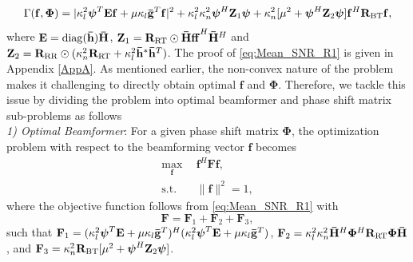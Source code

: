 \documentclass[journal,draftclsnofoot,onecolumn,12pt]{IEEEtran}
\begin{document}
\begin{align}
   \Gamma(\mathbf{f},\mathbf{\Phi}) = |\kappa_l^2\boldsymbol{\psi}^T\mathbf{Ef} + \mu\kappa_l\mathbf{\Bar{g}}^T\mathbf{f}|^2 + \kappa_l^2\kappa_n^2\boldsymbol{\psi}^H\mathbf{Z}_1\boldsymbol{\psi} + \kappa_n^2[\mu^2+\boldsymbol{\psi}^H\mathbf{Z}_2\boldsymbol{\psi}]\mathbf{f}^H\mathbf{R}_{\rm BT}\mathbf{f},\label{eq:Mean_SNR_R1}
\end{align}
where $\mathbf{E}={\rm diag}(\mathbf{\Bar{h}})\mathbf{\Bar{H}}$, $\mathbf{Z}_1 = \mathbf{R}_{\rm RT}\odot\mathbf{\Bar{H}ff}^H\mathbf{\Bar{H}}^H$ and $\mathbf{Z}_2 = \mathbf{R}_{\rm RR}\odot( \kappa_n^2\mathbf{R}_{\rm RT}+\kappa_l^2\mathbf{\Bar{h}}^*\mathbf{\Bar{h}}^T)$. The proof of \eqref{eq:Mean_SNR_R1} is given in Appendix \ref{AppA}. As mentioned earlier, the non-convex nature of the problem makes it challenging to directly obtain optimal $\mathbf{f}$ and $\mathbf{\Phi}$. Therefore, we tackle this issue by dividing the problem into optimal beamformer and phase shift matrix sub-problems as follows\\
\emph{1) Optimal Beamformer}: For a given phase shift matrix $\mathbf{\Phi}$, the optimization problem with respect to the beamforming vector $\mathbf{f}$ becomes
\begin{subequations}
\begin{align}
    \max_{\mathbf{f}} ~~& \mathbf{f}^H\mathbf{F}\mathbf{f}, \label{subprob_f_R1}\\
\text{s.t.} ~~& \|\mathbf{f}\|^2 = 1,
\end{align}
\end{subequations}
where the objective function follows from \eqref{eq:Mean_SNR_R1} with
\begin{equation}
    \mathbf{F} = \mathbf{F}_1 + \mathbf{F}_2 + \mathbf{F}_3,\label{M}
\end{equation}
such that $\mathbf{F}_1= (\kappa_l^2\boldsymbol{\psi}^T\mathbf{E} + \mu\kappa_l\mathbf{\Bar{g}}^T)^H(\kappa_l^2\boldsymbol{\psi}^T\mathbf{E} + \mu\kappa_l\mathbf{\Bar{g}}^T)$, $\mathbf{F}_2=\kappa_l^2\kappa_n^2\mathbf{\Bar{H}}^H\mathbf{\Phi}^H\mathbf{R}_{\rm RT}\mathbf{\Phi\Bar{H}}$, and $\mathbf{F}_3=\kappa_n^2\mathbf{R}_{\rm BT}[\mu^2+\boldsymbol{\psi}^H\mathbf{Z}_2\boldsymbol{\psi}]$.
\end{document}
